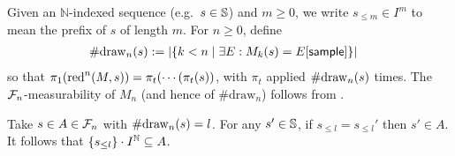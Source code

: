 Given an $\mathbb N$-indexed sequence (e.g.~$s \in {\mathbb{S}}$) and $m \geq 0$, we write $s_{\leq m} \in I^m$ to mean the prefix of $s$ of length $m$.
For $n \geq 0$, define
\begin{align*}
\#\mathrm{draw}_{n}(s) &:= |\{k < n \mid \exists E: M_k(s) = E[\mathsf{sample}]\}|
\end{align*}
so that $\pi_1 (\red^n(M, s)) = %
\pi_t( \cdots (\pi_t (s))$, with $\pi_t$ applied ${\#\mathrm{draw}_{n}(s)}$ times.
The $\mathcal{F}_n$-measurability of $M_n$ (and hence of $\#\mathrm{draw}_n$) follows from \citep{DBLP:conf/icfp/BorgstromLGS16}.
\iffalse
\akr{$\#\mathrm{draw}_n$ is not a stopping time. It doesn't look like you actually use this claim anyway, so it should just be fine to remove, but did you mean something different?} 
\lo{I agree, and I don't actually use this claim.}
\fi
Take $s \in A \in \mathcal{F}_n$ with $\#\mathrm{draw}_{n}(s) = l$.
For any $s'\in {\mathbb{S}}$, if $s_{\leq l} = s_{\leq l}'$ then $s' \in A$.
It follows that ${\{s_{\leq l}\} \cdot I^{\mathbb N}} \subseteq A$.

